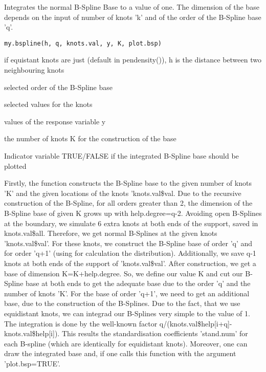 \begin{Description}\relax
Integrates the normal B-Spline Base to a value of one. The dimension of the base depends on the input of number of knots 'k' and of the order of the B-Spline base 'q'.
\end{Description}
\begin{Usage}
\begin{verbatim}
my.bspline(h, q, knots.val, y, K, plot.bsp)
\end{verbatim}
\end{Usage}
\begin{Arguments}
\begin{ldescription}
\item[\code{h}] if equistant knots are just (default in pendensity()), h is the distance between two neighbouring knots
\item[\code{q}] selected order of the B-Spline base
\item[\code{knots.val}] selected values for the knots
\item[\code{y}] values of the response variable y
\item[\code{K}] the number of knots K for the construction of the base
\item[\code{plot.bsp}] Indicator variable TRUE/FALSE if the integrated B-Spline base should be plotted
\end{ldescription}
\end{Arguments}
\begin{Details}\relax
Firstly, the function constructs the B-Spline base to the given number of knots 'K' and the given locations of the knots 'knots.val\$val. Due to the recursive construction of the B-Spline, for all orders greater than 2, the dimension of the B-Spline base of given K grows up with help.degree=q-2. Avoiding open B-Splines at the boundary, we simulate 6 extra knots at both ends of the support, saved in knots.val\$all. Therefore, we get normal B-Splines at the given knots 'knots.val\$val'. For these knots, we construct the B-Spline base of order 'q' and for order 'q+1' (using for calculation the distribution). Additionally, we save q-1 knots at both ends of the support of 'knots.val\$val'. After construction, we get a base of dimension K=K+help.degree. So, we define our value K and cut our B-Spline base at both ends to get the adequate base due to the order 'q' and the number of knots 'K'. For the base of order 'q+1', we need to get an additional base, due to the construction of the B-Splines. Due to the fact, that we use equidistant knots, we can integrad our B-Splines very simple to the value of 1. The integration is done by the well-known factor q/(knots.val\$help[i+q]-knots.val\$help[i]). This results the standardisation coefficients 'stand.num' for each B-spline (which are identically for equidistant knots). Moreover, one can draw the integrated base and, if one calls this function with the argument 'plot.bsp=TRUE'.
\end{Details}
